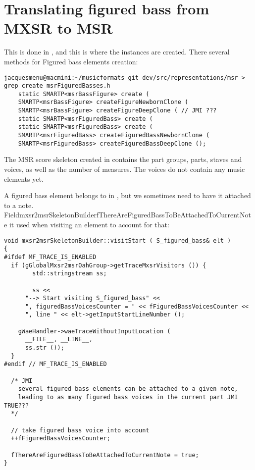 \section{Translating figured bass from MXSR to MSR}

This is done in \mxsrToMsr{}, and this is where the  instances are created.
There several methods for Figured bass elements creation:%
\begin{lstlisting}[language=Terminal]
jacquesmenu@macmini:~/musicformats-git-dev/src/representations/msr > grep create msrFiguredBasses.h
    static SMARTP<msrBassFigure> create (
    SMARTP<msrBassFigure> createFigureNewbornClone (
    SMARTP<msrBassFigure> createFigureDeepClone ( // JMI ???
    static SMARTP<msrFiguredBass> create (
    static SMARTP<msrFiguredBass> create (
    SMARTP<msrFiguredBass> createFiguredBassNewbornClone (
    SMARTP<msrFiguredBass> createFiguredBassDeepClone ();
\end{lstlisting}

The MSR score skeleton created in  contains the part groups, parts, staves and voices, as well as the number of measures. The voices do not contain any music elements yet.

A figured bass element belongs to  in \mxml, but we sometimes need to have it attached to a note.\\
Field{mxsr2msrSkeletonBuilder}{fThereAreFiguredBassToBeAttachedToCurrentNote} it used when visiting an  element to account for that:%
\begin{lstlisting}[language=CPlusPlus]
void mxsr2msrSkeletonBuilder::visitStart ( S_figured_bass& elt )
{
#ifdef MF_TRACE_IS_ENABLED
  if (gGlobalMxsr2msrOahGroup->getTraceMxsrVisitors ()) {
		std::stringstream ss;

		ss <<
      "--> Start visiting S_figured_bass" <<
      ", figuredBassVoicesCounter = " << fFiguredBassVoicesCounter <<
      ", line " << elt->getInputStartLineNumber ();

    gWaeHandler->waeTraceWithoutInputLocation (
      __FILE__, __LINE__,
      ss.str ());
  }
#endif // MF_TRACE_IS_ENABLED

  /* JMI
    several figured bass elements can be attached to a given note,
    leading to as many figured bass voices in the current part JMI TRUE???
  */

  // take figured bass voice into account
  ++fFiguredBassVoicesCounter;

  fThereAreFiguredBassToBeAttachedToCurrentNote = true;
}
\end{lstlisting}

